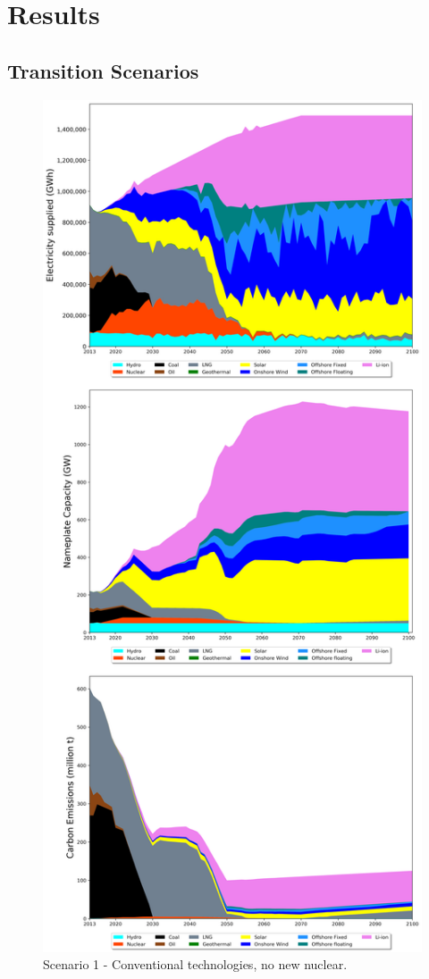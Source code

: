 \section{Results} \label{Results-and-discussion}

\subsection{Transition Scenarios}

\begin{figure}[htb] 
\centering
\vspace*{-3cm}
\includegraphics[scale=0.42]{figures/conv_nonuc}
\caption{Scenario 1 - Conventional technologies, no new nuclear.}
\label{scen1}
\end{figure}

